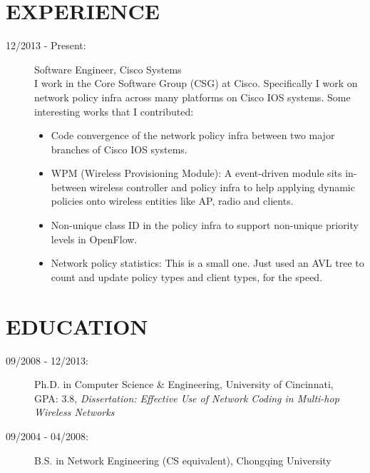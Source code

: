 \documentclass[line]{res}
\begin{document}
\address{350 Elan Village Ln \#111 \\ San Jose, CA 95134 \\ 513-679-0772}
\address{Email: \href{mailto:yang@yangchi.me}{yang@yangchi.me} \\ Github: \url{https://github.com/yangchi} }

\begin{resume}
	\section{EXPERIENCE}
	\begin{description}
		\item[12/2013 - Present:] Software Engineer, Cisco Systems \\
		I work in the Core Software Group (CSG) at Cisco. Specifically I work on network policy infra across many platforms on Cisco IOS systems. Some interesting works that I contributed:
            \begin{itemize}
            \item Code convergence of the network policy infra between two major branches of Cisco IOS systems.
            \item WPM (Wireless Provisioning Module): A event-driven module sits in-between wireless controller and policy infra to help applying dynamic policies onto wireless entities like AP, radio and clients.
            \item Non-unique class ID in the policy infra to support non-unique priority levels in OpenFlow.
            \item Network policy statistics: This is a small one. Just used an AVL tree to count and update policy types and client types, for the speed.
            \end{itemize}
	\end{description}
	\section{EDUCATION}
	\begin{description}
		\item[09/2008 - 12/2013:] Ph.D. in Computer Science \& Engineering, University of Cincinnati, \\
			GPA: 3.8, \emph{Dissertation: Effective Use of Network Coding in Multi-hop Wireless Networks}
		\item[09/2004 - 04/2008:] B.S. in Network Engineering (CS equivalent), Chongqing University
	\end{description}
	

\end{resume}
\end{document}
